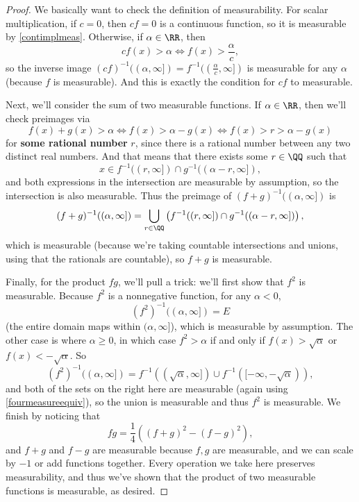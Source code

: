 \begin{proof}
We basically want to check the definition of measurability. For scalar multiplication, if $c = 0$, then $cf = 0$ is a continuous function, so it is measurable by \cref{contimplmeas}. Otherwise, if $\alpha \in \RR$, then 
\[
    cf(x) > \alpha \iff f(x) > \frac{\alpha}{c},
\]
so the inverse image $(cf)^{-1}((\alpha, \infty]) = f^{-1}((\frac{\alpha}{c}, \infty])$ is measurable for any $\alpha$ (because $f$ is measurable). And this is exactly the condition for $cf$ to measurable. 

Next, we'll consider the sum of two measurable functions. If $\alpha \in \RR$, then we'll check preimages via
\[
    f(x) + g(x) > \alpha \iff f(x) > \alpha - g(x) \iff f(x) > r > \alpha - g(x)
\]
for \textbf{some rational number} $r$, since there is a rational number between any two distinct real numbers. And that means that there exists some $r \in \QQ$ such that 
\[
    x \in f^{-1}((r, \infty]) \cap g^{-1}((\alpha - r, \infty]),
\]
and both expressions in the intersection are measurable by assumption, so the intersection is also measurable. Thus the preimage of $(f+g)^{-1}((\alpha, \infty])$ is
\[
    (f+g)^{-1}((\alpha, \infty]) = \bigcup_{r \in \QQ} \left(f^{-1}((r, \infty]) \cap g^{-1}((\alpha - r, \infty])\right),
\]
which is measurable (because we're taking countable intersections and unions, using that the rationals are countable), so $f+g$ is measurable. 

Finally, for the product $fg$, we'll pull a trick: we'll first show that $f^2$ is measurable. Because $f^2$ is a nonnegative function, for any $\alpha < 0$,
\[
    (f^2)^{-1}((\alpha, \infty]) = E
\]
(the entire domain maps within $(\alpha, \infty]$), which is measurable by assumption. The other case is where $\alpha \ge 0$, in which case $f^2 > \alpha$ if and only if $f(x) > \sqrt{\alpha}$ or $f(x) < -\sqrt{\alpha}$. So
\[
    (f^2)^{-1}((\alpha, \infty]) = f^{-1}((\sqrt{\alpha}, \infty]) \cup f^{-1}([-\infty, -\sqrt{\alpha})),
\]
and both of the sets on the right here are measurable (again using \cref{fourmeasureequiv}), so the union is measurable and thus $f^2$ is measurable. We finish by noticing that 
\[
    fg = \frac{1}{4} \left((f + g)^2 - (f-g)^2\right),
\]
and $f+g$ and $f-g$ are measurable because $f, g$ are measurable, and we can scale by $-1$ or add functions together. Every operation we take here preserves measurability, and thus we've shown that the product of two measurable functions is measurable, as desired.
\end{proof}

